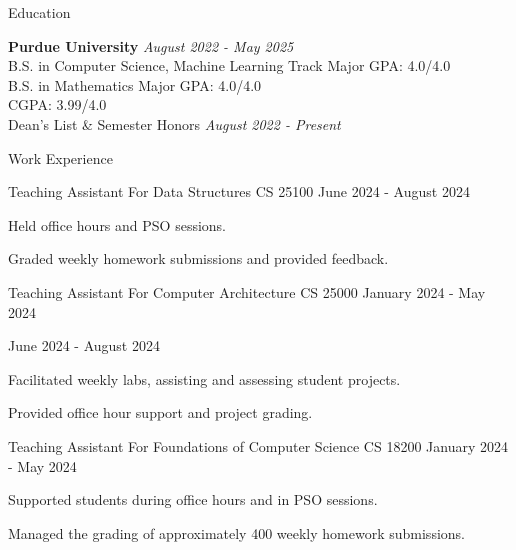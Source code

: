 \documentclass[
    11pt, %
]{resume} %
\begin{document}

\small
\begin{rSection}{Education}

    \textbf{Purdue University} \hfill \textit{August 2022 - May 2025} \\ 
    B.S. in Computer Science, Machine Learning Track \hfill Major GPA: 4.0/4.0 \\
    B.S. in Mathematics \hfill Major GPA: 4.0/4.0 \\
    \hspace*{\fill}  CGPA: 3.99/4.0 \\
    Dean's List \& Semester Honors \hfill {\em August 2022 - Present} 
    
\end{rSection}
\vspace*{-0.5cm}

\begin{rSection}{Work Experience}
    \begin{rSubsection}
        {Teaching Assistant For Data Structures CS 25100}
        {June 2024 - August 2024}
        {}
        {}
        \item Held office hours and PSO sessions.
        \item Graded weekly homework submissions and provided feedback.
    \end{rSubsection}
    \vspace*{3pt}
    \begin{rSubsection}
        {Teaching Assistant For Computer Architecture CS 25000}
        {January 2024 - May 2024}
        {}
        {}
      \item \hspace{375pt} June 2024 - August 2024
      \item Facilitated weekly labs, assisting and assessing student projects. 
      \item Provided office hour support and project grading.
    \end{rSubsection}
    \vspace*{3pt}
    \begin{rSubsection}
        {Teaching Assistant For Foundations of Computer Science CS 18200}
        {January 2024 - May 2024}
        {}
        {}
        \item Supported students during office hours and in PSO sessions.
        \item Managed the grading of approximately 400 weekly homework submissions.
    \end{rSubsection}
\end{rSection}
\end{document}
